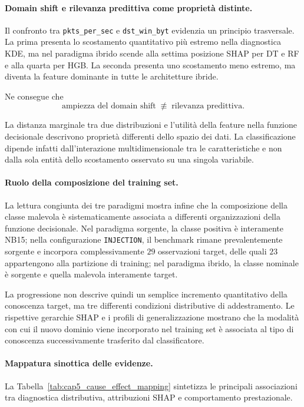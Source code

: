 \paragraph{Domain shift e rilevanza predittiva come proprietà distinte.}
Il confronto tra \texttt{pkts\_per\_sec} e \texttt{dst\_win\_byt} evidenzia un principio trasversale. 
La prima presenta lo scostamento quantitativo più estremo nella diagnostica KDE, ma nel paradigma ibrido scende alla settima posizione SHAP per DT e RF e alla quarta per HGB. 
La seconda presenta uno scostamento meno estremo, ma diventa la feature dominante in tutte le architetture ibride.

Ne consegue che
\[
    \text{ampiezza del domain shift}
    \;\not\equiv\;
    \text{rilevanza predittiva}.
\]

La distanza marginale tra due distribuzioni e l'utilità della feature nella funzione decisionale descrivono proprietà differenti dello spazio dei dati.
La classificazione dipende infatti dall'interazione multidimensionale tra le caratteristiche e non dalla sola entità dello scostamento osservato su una singola variabile.

\paragraph{Ruolo della composizione del training set.}
La lettura congiunta dei tre paradigmi mostra infine che la composizione della classe malevola è sistematicamente associata a differenti organizzazioni della funzione decisionale. 
Nel paradigma sorgente, la classe positiva è interamente NB15; nella configurazione \texttt{INJECTION}, il benchmark rimane prevalentemente sorgente e incorpora complessivamente $29$ osservazioni target, delle quali $23$ appartengono alla partizione di training; nel paradigma ibrido, la classe nominale è sorgente e quella malevola interamente target. 

La progressione non descrive quindi un semplice incremento quantitativo della conoscenza target, ma tre differenti condizioni distributive di addestramento. 
Le rispettive gerarchie SHAP e i profili di generalizzazione mostrano che la modalità con cui il nuovo dominio viene incorporato nel training set è associata al tipo di conoscenza successivamente trasferito dal classificatore.

\paragraph{Mappatura sinottica delle evidenze.}
La Tabella~\ref{tab:cap5_cause_effect_mapping} sintetizza le principali associazioni tra diagnostica distributiva, attribuzioni SHAP e comportamento prestazionale.


